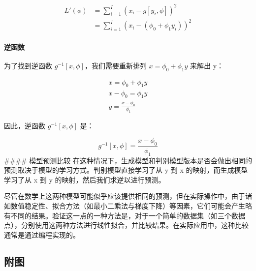 \documentclass[
]{article}
\begin{document}
\[
\begin{align}
L'(\phi) &= \sum_{i=1}^{I} (x_i - g[y_i, \phi])^2 \\
&= \sum_{i=1}^{I} (x_i - (\phi_0 + \phi_1 y_i))^2 
\end{align}
\]

\hypertarget{ux9006ux51fdux6570}{%
\paragraph{逆函数}\label{ux9006ux51fdux6570}}

为了找到逆函数 \(g^{-1}[x, \phi]\)，我们需要重新排列
\(x = \phi_0 + \phi_1 y\) 来解出 y：

\[
\begin{align}
x = \phi_0 + \phi_1 y \\
x - \phi_0 = \phi_1 y \\ 
y = \frac{x - \phi_0}{\phi_1}
\end{align}
\]

因此，逆函数 \(g^{-1}[x, \phi]\) 是：

\[
g^{-1}[x, \phi] = \frac{x - \phi_0}{\phi_1} 
\] \#\#\#\# 模型预测比较
在这种情况下，生成模型和判别模型版本是否会做出相同的预测取决于模型的学习方式。判别模型直接学习了从
y 到 x 的映射，而生成模型学习了从 x 到 y
的映射，然后我们求逆以进行预测。

尽管在数学上这两种模型可能似乎应该提供相同的预测，但在实际操作中，由于诸如数值稳定性、拟合方法（如最小二乘法与梯度下降）等因素，它们可能会产生略有不同的结果。验证这一点的一种方法是，对于一个简单的数据集（如三个数据点），分别使用这两种方法进行线性拟合，并比较结果。在实际应用中，这种比较通常是通过编程实现的。

\hypertarget{ux9644ux56fe}{%
\subsection{附图}\label{ux9644ux56fe}}
\end{document}
